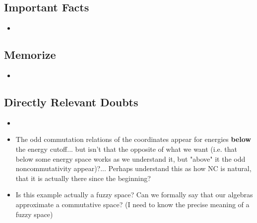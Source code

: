 \documentclass{article}
\begin{document}
\subsection*{Important Facts}

    \begin{itemize}

    \item 
    
    \end{itemize}

\subsection*{Memorize}

    \begin{itemize}

    \item 
    
    \end{itemize}

\subsection*{Directly Relevant Doubts}

    \begin{itemize}

    \item{}
    
    \item The odd commutation relations of the coordinates appear for energies \textbf{below} the energy cutoff... but isn't that the opposite of what we want (i.e. that below some energy space works as we understand it, but "above" it the odd noncommutativity appear)?... Perhaps understand this as how NC is natural, that it is actually there since the beginning?
    
    \item Is this example actually a fuzzy space? Can we formally say that our algebras approximate a commutative space? (I need to know the precise meaning of a fuzzy space)
    
    \end{itemize}
    
\end{document}
